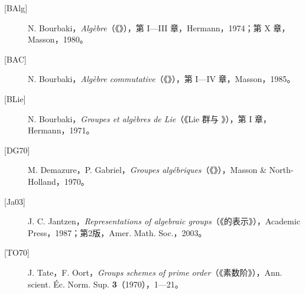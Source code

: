 \begin{description}
 \item[{[BAlg]}] N. Bourbaki，\emph{Algèbre}（《》），第 I—III 章，Hermann，1974；第 X 章，Masson，1980。
 \item[{[BAC]}] N. Bourbaki，\emph{Algèbre commutative}（《》），第 I—IV 章，Masson，1985。
 \item[{[BLie]}] N. Bourbaki，\emph{Groupes et algèbres de Lie}（《Lie 群与 》），第 I 章，Hermann，1971。
 \item[{[DG70]}] M. Demazure，P. Gabriel，\emph{Groupes algébriques}（《》），Masson \& North-Holland，1970。
 \item[{[Ja03]}] J. C. Jantzen，\emph{Representations of algebraic groups}（《的表示》），Academic Press，1987；第2版，Amer. Math. Soc.，2003。
 \item[{[TO70]}] J. Tate，F. Oort，\emph{Groups schemes of prime order}（《素数阶》），Ann. scient. Éc. Norm. Sup. \textbf{3}（1970），1—21。
\end{description}
